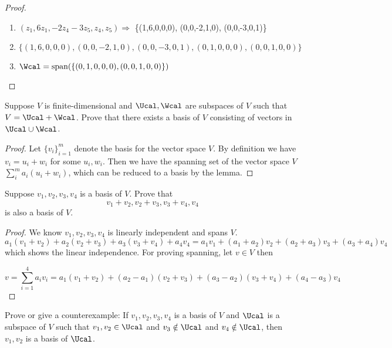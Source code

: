 \documentclass{extarticle}
\begin{document}
\begin{proof}
\begin{enumerate}
    \item  \((z_1, 6z_1, -2z_4 - 3 z_5, z_4, z_5) \Rightarrow\)   \{(1,6,0,0,0), (0,0,-2,1,0), (0,0,-3,0,1)\}
    \item \(\{(1,6,0,0,0), (0,0,-2,1,0), (0,0,-3,0,1), (0,1,0,0,0), (0,0,1,0,0)\}\)
    \item \(\Wcal = \text{span}(\{(0,1,0,0,0), (0,0,1,0,0)\})\)
\end{enumerate}
\end{proof}

\begin{problem}{5}
Suppose \(V\) is finite-dimensional and \(\Ucal, \Wcal\) are subspaces of \(V\) such that \(V = \Ucal
+ \Wcal\). Prove that there exists a basis of \(V\) consisting of vectors in \(\Ucal \cup \Wcal\).    
\end{problem}

\begin{proof}
Let \(\{v_i\}_{i=1}^m\) denote the basis for the vector space \(V\). By definition we have 
\(v_i = u_i + w_i\) for some \(u_i, w_i\). Then we have the spanning set of the vector space \(V\)
\(\sum_i^m a_i (u_i + w_i)\), which can be reduced to a basis by the lemma.
\end{proof}

\begin{problem}{7}
    Suppose \(v_1, v_2, v_3, v_4\) is a basis of \(V\). Prove that 
    \[v_1 + v_2, v_2 + v_3, v_3+v_4, v_4\]
    is also a basis of \(V\). 
\end{problem}

\begin{proof}
We know \(v_1, v_2, v_3, v_4\) is linearly independent and spans \(V\). 
\[a_1(v_1 + v_2) + a_2 (v_2 + v_3) + a_3 (v_3 + v_4) + a_4 v_4 = a_1 v_1 
+ (a_1 + a_2) v_2 + (a_2 + a_3)v_3 + (a_3 + a_4)v_4\]
which shows the linear independence. For proving spanning, let \(v \in V\) then 

\[v = \sum_{i=1}^4 a_i v_i = a_1(v_1 + v_2) + (a_2 - a_1)(v_2 + v_3)
+ (a_3 - a_2)(v_3 + v_4) + (a_4 - a_3)v_4\]
\end{proof}

\begin{problem}{8}
    Prove or give a counterexample: If \(v_1, v_2, v_3, v_4\) is a basis of \(V\) and 
    \(\Ucal\) is a subspace of \(V\) such that \(v_1, v_2 \in \Ucal\) and \(v_3 \notin \Ucal\)
    and \(v_4 \notin \Ucal\), then \(v_1, v_2\) is a basis of \(\Ucal\). 
\end{problem}
\end{document}
